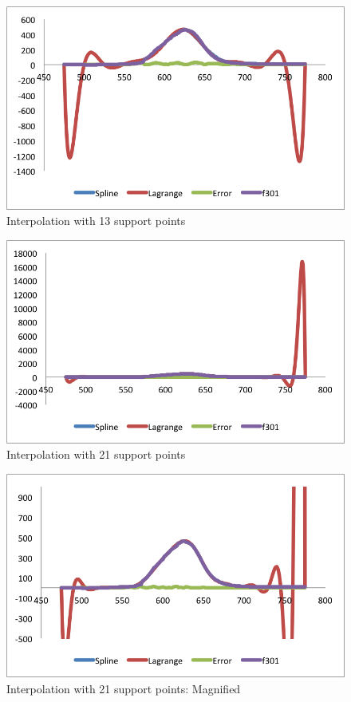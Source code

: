 \documentclass[12pt,a4paper]{article}
\begin{document}
\begin{figure}[h!]
  \centering
      \includegraphics[width=1\textwidth]{./13.png}
  \caption{Interpolation with 13 support points}
\end{figure}
\begin{figure}[h!]
  \centering
      \includegraphics[width=1\textwidth]{./21.png}
  \caption{Interpolation with 21 support points}
\end{figure}
\begin{figure}[h!]
  \centering
      \includegraphics[width=1\textwidth]{./21_2.png}
  \caption{Interpolation with 21 support points: Magnified}
\end{figure}
\end{document}
